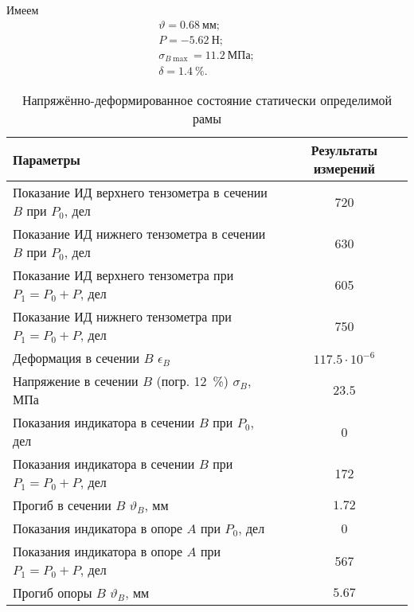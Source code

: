 Имеем
\begin{align*}
    \vartheta = 0.68~мм; \\
    P = -5.62~Н; \\
    \sigma_{B \max} = 11.2~МПа; \\
    \delta = 1.4~\%.
\end{align*}

\begin{table}[H]
    \centering
    \caption{Напряжённо-деформированное состояние статически определимой рамы}
    \label{tab:static-definable-beam}
    \begin{tabular}{|l|c|}
        \hline
        Параметры                                                     & Результаты измерений  \\ \hline
        Показание ИД верхнего тензометра в сечении $B$ при $P_0$, дел & 720                   \\ \hline
        Показание ИД нижнего тензометра в сечении $B$ при $P_0$, дел  & 630                   \\ \hline
        Показание ИД верхнего тензометра при $P_1 = P_0 + P$, дел     & 605                   \\ \hline
        Показание ИД нижнего тензометра при $P_1 = P_0 + P$, дел      & 750                   \\ \hline
        Деформация в сечении $B$ $\epsilon_B$                         & $117.5 \cdot 10^{-6}$ \\ \hline
        Напряжение в сечении $B$ (погр. 12~\%) $\sigma_B$, МПа        & $23.5$                \\ \hline
        Показания индикатора в сечении $B$ при $P_0$, дел             & 0                     \\ \hline
        Показания индикатора в сечении $B$ при $P_1 = P_0 + P$, дел   & 172                   \\ \hline
        Прогиб в сечении $B$ $\vartheta_B$, мм                        & $1.72$                \\ \hline
        Показания индикатора в опоре $A$ при $P_0$, дел               & 0                     \\ \hline
        Показания индикатора в опоре $A$ при $P_1 = P_0 + P$, дел     & 567                   \\ \hline
        Прогиб опоры $B$ $\vartheta_B$, мм                            & $5.67$                \\ \hline
    \end{tabular}
\end{table}

